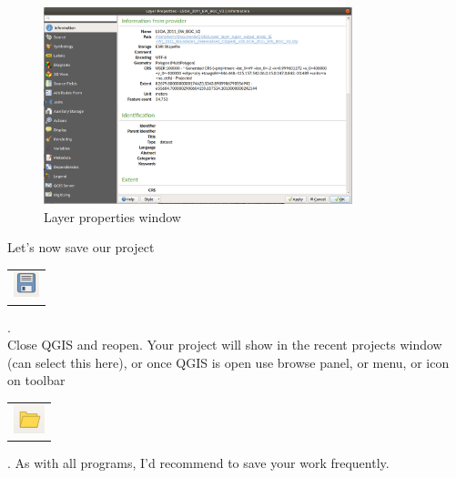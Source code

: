 \begin{figure}[!h]
	\centering
	\includegraphics[width=0.8\textwidth]{images/layer_properties_window.png}
	\caption{Layer properties window}
	\label{ft_fig_firstfig3}
\end{figure}



Let's now save our project
\begin{tabular}{@{}c@{}}\includegraphics[width=4ex]{images/save_project_icon.png}\end{tabular}.\\

Close QGIS and reopen. Your project will show in the recent projects window (can select this here), or once QGIS is open use browse panel, or menu, or icon on toolbar \begin{tabular}{@{}c@{}}\includegraphics[width=4ex]{images/open_project_icon.png}\end{tabular}. As with all programs, I'd recommend to save your work frequently.